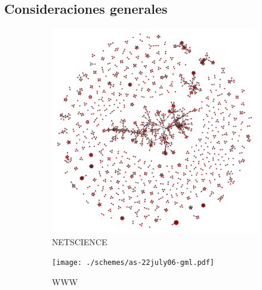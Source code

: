 \subsection{Consideraciones generales}
\begin{figure}[!ht]
    \centering
    \begin{subfigure}[b]{0.30\columnwidth}
        \includegraphics[width=\textwidth]{./schemes/netscience-gml.pdf}
        \caption{\label{fig4:NETSCIENCE}NETSCIENCE}
    \end{subfigure}
    \begin{subfigure}[b]{0.30\columnwidth}
        \texttt{[image: ./schemes/as-22july06-gml.pdf]}
        \caption{\label{fig4:WWW}WWW}
    \end{subfigure}
    \\
    \begin{subfigure}[b]{0.30\columnwidth}

\end{subfigure}
\end{figure}
